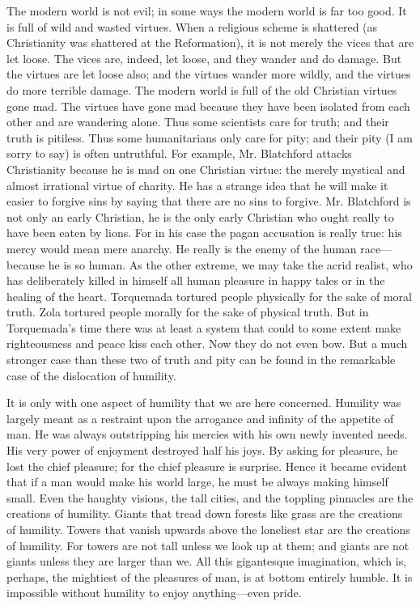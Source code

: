 The modern world is not evil; in some ways the modern world is far too good. It is full of wild and wasted virtues. When a religious scheme is shattered (as Christianity was shattered at the Reformation), it is not merely the vices that are let loose. The vices are, indeed, let loose, and they wander and do damage. But the virtues are let loose also; and the virtues wander more wildly, and the virtues do more terrible damage. The modern world is full of the old Christian virtues gone mad. The virtues have gone mad because they have been isolated from each other and are wandering alone. Thus some scientists care for truth; and their truth is pitiless. Thus some humanitarians only care for pity; and their pity (I am sorry to say) is often untruthful. For example, Mr. Blatchford attacks Christianity because he is mad on one Christian virtue: the merely mystical and almost irrational virtue of charity. He has a strange idea that he will make it easier to forgive sins by saying that there are no sins to forgive. Mr. Blatchford is not only an early Christian, he is the only early Christian who ought really to have been eaten by lions. For in his case the pagan accusation is really true: his mercy would mean mere anarchy. He really is the enemy of the human race—because he is so human. As the other extreme, we may take the acrid realist, who has deliberately killed in himself all human pleasure in happy tales or in the healing of the heart. Torquemada tortured people physically for the sake of moral truth. Zola tortured people morally for the sake of physical truth. But in Torquemada’s time there was at least a system that could to some extent make righteousness and peace kiss each other. Now they do not even bow. But a much stronger case than these two of truth and pity can be found in the remarkable case of the dislocation of humility.

It is only with one aspect of humility that we are here concerned. Humility was largely meant as a restraint upon the arrogance and infinity of the appetite of man. He was always outstripping his mercies with his own newly invented needs. His very power of enjoyment destroyed half his joys. By asking for pleasure, he lost the chief pleasure; for the chief pleasure is surprise. Hence it became evident that if a man would make his world large, he must be always making himself small. Even the haughty visions, the tall cities, and the toppling pinnacles are the creations of humility. Giants that tread down forests like grass are the creations of humility. Towers that vanish upwards above the loneliest star are the creations of humility. For towers are not tall unless we look up at them; and giants are not giants unless they are larger than we. All this gigantesque imagination, which is, perhaps, the mightiest of the pleasures of man, is at bottom entirely humble. It is impossible without humility to enjoy anything—even pride.

